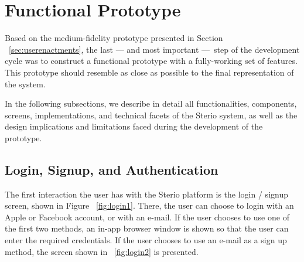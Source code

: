 
\section{Functional Prototype}

Based on the medium-fidelity prototype presented in Section ~\ref{sec:userenactments}, the last — and most important — step of the development cycle was to construct a functional prototype with a fully-working set of features. This prototype should resemble as close as possible to the final representation of the system. 

In the following subsections, we describe in detail all functionalities, components, screens, implementations, and technical facets of the Sterio system, as well as the design implications and limitations faced during the development of the prototype. %

\subsection{Login, Signup, and Authentication}

The first interaction the user has with the Sterio platform is the login / signup screen, shown in Figure ~\ref{fig:login1}. There, the user can choose to login with an Apple or Facebook account, or with an e-mail. If the user chooses to use one of the first two methods, an in-app browser window is shown so that the user can enter the required credentials. If the user chooses to use an e-mail as a sign up method, the screen shown in ~\ref{fig:login2} is presented.

